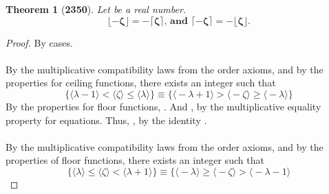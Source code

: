 \documentclass[preview]{standalone}
\newtheorem*{theorem*}{Theorem}
\begin{document}
\begin{theorem*}[\textbf{2350}]
    Let \bm{$\zeta$} be a real number. 
    \begin{equation*}
        \bm{
            \lfloor - \zeta \rfloor 
                = 
            - \lceil \zeta \rceil
                \textbf{, and }
            \lceil - \zeta \rceil
                = 
            - \lfloor \zeta \rfloor
        }.
    \end{equation*}
\end{theorem*}

\begin{proof}
    By cases.
    \\ \\
     By the multiplicative compatibility laws from the order axioms,
    and by the properties for ceiling functions,
    there exists an integer \bm{$\lceil \zeta \rceil = \lambda$} such that
    \begin{equation*}
        \Bigg\{
            \Big \langle \lambda - 1 \Big \rangle
                <
            \Big \langle \zeta \Big \rangle
                \leq
            \Big \langle \lambda \Big \rangle
        \Bigg\}
            \equiv
        \Bigg\{
            \Big \langle - \lambda + 1 \Big \rangle 
                > 
            \Big \langle - \zeta \Big \rangle
                \ge 
            \Big \langle - \lambda \Big \rangle
        \Bigg\}
    \end{equation*}
    By the properties for floor functions, 
    \bm{$\lfloor - \zeta \rfloor = - \lambda$}.
    And \bm{$-1 \times \lceil \zeta \rceil = - \lambda$}, 
    by the multiplicative equality property for equations.
    Thus, \bm{$\lfloor - \zeta \rfloor = - \lceil \zeta \rceil$}, 
    by the identity \bm{$- \lambda$}.
    \\ \\
     By the multiplicative compatibility laws from the order axioms,
    and by the properties of floor functions,
    there exists an integer \bm{$\lfloor \zeta \rfloor = \lambda$} such that
    \begin{equation*}
        \Bigg\{
            \Big \langle \lambda \Big \rangle
                \le 
            \Big \langle \zeta \Big \rangle
                < 
            \Big \langle \lambda + 1 \Big \rangle
        \Bigg\}
            \equiv
        \Bigg\{
            \Big \langle - \lambda \Big \rangle
                \ge 
            \Big \langle - \zeta \Big \rangle
                > 
            \Big \langle - \lambda - 1 \Big \rangle

\end{equation*}
\end{proof}
\end{document}
